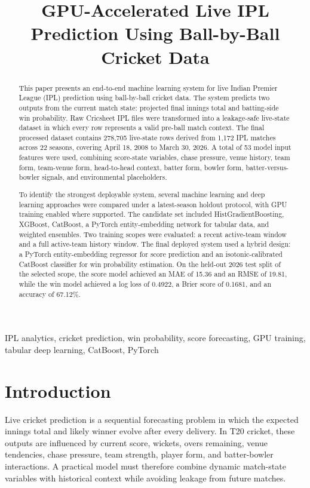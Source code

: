 \documentclass[conference]{IEEEtran}
\title{GPU-Accelerated Live IPL Prediction Using Ball-by-Ball Cricket Data}
\author{
\IEEEauthorblockN{Rahul}
\IEEEauthorblockA{
Independent Project\\
Email: rahul@example.com
}
}
\begin{document}
\maketitle

\begin{abstract}
This paper presents an end-to-end machine learning system for live Indian Premier League (IPL) prediction using ball-by-ball cricket data. The system predicts two outputs from the current match state: projected final innings total and batting-side win probability. Raw Cricsheet IPL files were transformed into a leakage-safe live-state dataset in which every row represents a valid pre-ball match context. The final processed dataset contains 278,705 live-state rows derived from 1,172 IPL matches across 22 seasons, covering April 18, 2008 to March 30, 2026. A total of 53 model input features were used, combining score-state variables, chase pressure, venue history, team form, team-venue form, head-to-head context, batter form, bowler form, batter-versus-bowler signals, and environmental placeholders.

To identify the strongest deployable system, several machine learning and deep learning approaches were compared under a latest-season holdout protocol, with GPU training enabled where supported. The candidate set included HistGradientBoosting, XGBoost, CatBoost, a PyTorch entity-embedding network for tabular data, and weighted ensembles. Two training scopes were evaluated: a recent active-team window and a full active-team history window. The final deployed system used a hybrid design: a PyTorch entity-embedding regressor for score prediction and an isotonic-calibrated CatBoost classifier for win probability estimation. On the held-out 2026 test split of the selected scope, the score model achieved an MAE of 15.36 and an RMSE of 19.81, while the win model achieved a log loss of 0.4922, a Brier score of 0.1681, and an accuracy of 67.12\%.
\end{abstract}

\begin{IEEEkeywords}
IPL analytics, cricket prediction, win probability, score forecasting, GPU training, tabular deep learning, CatBoost, PyTorch
\end{IEEEkeywords}

\section{Introduction}
Live cricket prediction is a sequential forecasting problem in which the expected innings total and likely winner evolve after every delivery. In T20 cricket, these outputs are influenced by current score, wickets, overs remaining, venue tendencies, chase pressure, team strength, player form, and batter-bowler interactions. A practical model must therefore combine dynamic match-state variables with historical context while avoiding leakage from future matches.
\end{document}

